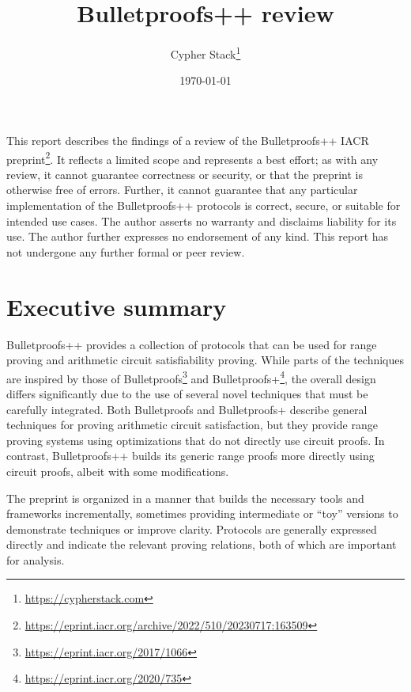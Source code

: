 \documentclass{article}
\title{Bulletproofs++ review}
\author{Cypher Stack\thanks{\url{https://cypherstack.com}}}
\date{\today}
\begin{document}
\maketitle

This report describes the findings of a review of the Bulletproofs++ IACR preprint\footnote{\url{https://eprint.iacr.org/archive/2022/510/20230717:163509}}.
It reflects a limited scope and represents a best effort; as with any review, it cannot guarantee correctness or security, or that the preprint is otherwise free of errors.
Further, it cannot guarantee that any particular implementation of the Bulletproofs++ protocols is correct, secure, or suitable for intended use cases.
The author asserts no warranty and disclaims liability for its use.
The author further expresses no endorsement of any kind.
This report has not undergone any further formal or peer review.

\tableofcontents


\section{Executive summary}

Bulletproofs++ provides a collection of protocols that can be used for range proving and arithmetic circuit satisfiability proving.
While parts of the techniques are inspired by those of Bulletproofs\footnote{\url{https://eprint.iacr.org/2017/1066}} and Bulletproofs+\footnote{\url{https://eprint.iacr.org/2020/735}}, the overall design differs significantly due to the use of several novel techniques that must be carefully integrated.
Both Bulletproofs and Bulletproofs+ describe general techniques for proving arithmetic circuit satisfaction, but they provide range proving systems using optimizations that do not directly use circuit proofs.
In contrast, Bulletproofs++ builds its generic range proofs more directly using circuit proofs, albeit with some modifications.

The preprint is organized in a manner that builds the necessary tools and frameworks incrementally, sometimes providing intermediate or ``toy'' versions to demonstrate techniques or improve clarity.
Protocols are generally expressed directly and indicate the relevant proving relations, both of which are important for analysis.
\end{document}
